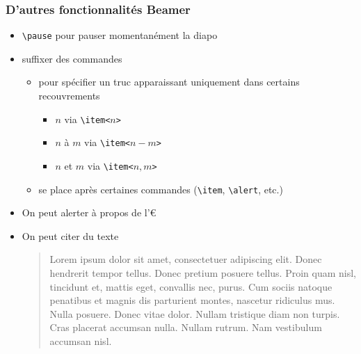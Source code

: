 \begin{frame}[fragile]
  \frametitle{D'autres fonctionnalités Beamer}

    
  \begin{itemize}
  \item \verb|\pause| pour pauser momentanément la diapo
    \pause
  \item<2> suffixer des commandes

    \begin{itemize}
    \item pour spécifier un truc apparaissant uniquement dans certains recouvrements

      \begin{itemize}
      \item $n$ via \verb|\item<|$n$\verb|>|
      \item $n$ à $m$ via \verb|\item<|$n-m$\verb|>|
      \item $n$ et $m$ via \verb|\item<|$n,m$\verb|>|
      \end{itemize}

    \item se place après certaines commandes (\verb|\item|, \verb|\alert|, etc.)
    \end{itemize}

  \end{itemize}
  
  \pause  
  
  
  \begin{itemize}
  \item On peut \alert{alerter} à propos de l'€
  \item On peut citer du texte
    
    \begin{quotation}
      Lorem ipsum dolor sit amet, consectetuer adipiscing elit. Donec hendrerit tempor tellus. Donec pretium posuere tellus. Proin quam nisl, tincidunt et, mattis eget, convallis nec, purus. Cum sociis natoque penatibus et magnis dis parturient montes, nascetur ridiculus mus. Nulla posuere. Donec vitae dolor. Nullam tristique diam non turpis. Cras placerat accumsan nulla. Nullam rutrum. Nam vestibulum accumsan nisl.
    \end{quotation}
    
  \end{itemize} 
\end{frame}

